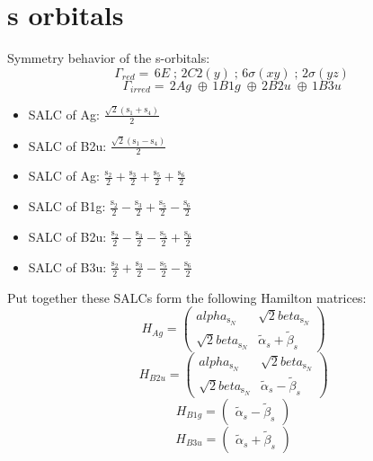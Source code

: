 \documentclass[12pt,a4paper]{article}
\begin{document}
\newpage \section*{s orbitals}
Symmetry behavior of the s-orbitals:
$$\mathsf{\Gamma}_{red} = \,6 E\;; \,2 C2(y)\;; \,6 \sigma (xy)\;; \,2 \sigma (yz)\;$$
$$\mathsf{\Gamma}_{irred} = \,2 Ag\;\oplus{}\,1 B1g\;\oplus{}\,2 B2u\;\oplus{}\,1 B3u\;$$


\begin{itemize}
\item SALC of Ag: \quad $\frac{\sqrt{2} \left(\text{s}_{1} + \text{s}_{4}\right)}{2}$
\item SALC of B2u: \quad $\frac{\sqrt{2} \left(\text{s}_{1} - \text{s}_{4}\right)}{2}$
\item SALC of Ag: \quad $\frac{\text{s}_{2}}{2} + \frac{\text{s}_{3}}{2} + \frac{\text{s}_{5}}{2} + \frac{\text{s}_{6}}{2}$
\item SALC of B1g: \quad $\frac{\text{s}_{2}}{2} - \frac{\text{s}_{3}}{2} + \frac{\text{s}_{5}}{2} - \frac{\text{s}_{6}}{2}$
\item SALC of B2u: \quad $\frac{\text{s}_{2}}{2} - \frac{\text{s}_{3}}{2} - \frac{\text{s}_{5}}{2} + \frac{\text{s}_{6}}{2}$
\item SALC of B3u: \quad $\frac{\text{s}_{2}}{2} + \frac{\text{s}_{3}}{2} - \frac{\text{s}_{5}}{2} - \frac{\text{s}_{6}}{2}$
\end{itemize}
Put together these SALCs form the following Hamilton matrices:
     $$ H_{Ag}= \begin{pmatrix}alpha_{\text{s}_N} & \sqrt{2} beta_{\text{s}_N}\\\sqrt{2} beta_{\text{s}_N} & \tilde{\alpha}_{s} + \tilde{\beta}_{s}\end{pmatrix}$$ 
     $$ H_{B2u}= \begin{pmatrix}alpha_{\text{s}_N} & \sqrt{2} beta_{\text{s}_N}\\\sqrt{2} beta_{\text{s}_N} & \tilde{\alpha}_{s} - \tilde{\beta}_{s}\end{pmatrix}$$ 
     $$ H_{B1g}= \begin{pmatrix}\tilde{\alpha}_{s} - \tilde{\beta}_{s}\end{pmatrix}$$ 
     $$ H_{B3u}= \begin{pmatrix}\tilde{\alpha}_{s} + \tilde{\beta}_{s}\end{pmatrix}$$ 
\end{document}
